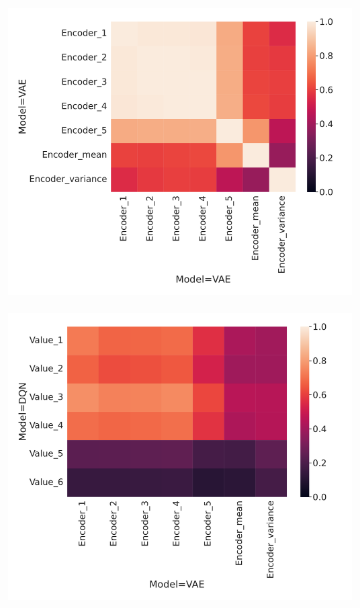 \documentclass[twoside,11pt]{article}
\begin{document}
\begin{figure}[ht!]
    \centering
    \begin{subfigure}{.4\textwidth}
        \centering
        \includegraphics[draft=false,width=\linewidth]{cka_figures/CKA_vae_1_vae_1}
        \caption{}\label{sfig:cka-vae-vae}
    \end{subfigure}%
    \begin{subfigure}{.4\textwidth}
        \centering
        \includegraphics[draft=false,width=\linewidth]{cka_figures/CKA_dqn_1_vae_1}
        \caption{}\label{sfig:cka-vae-dqn}

\end{subfigure}
\end{figure}
\end{document}
